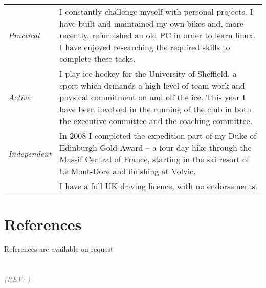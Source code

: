 \documentclass[oneside,a4paper]{article}
\begin{document}
\hspace{-6pt}\begin{tabular}{>{\it}lp{430pt}}
Practical & I constantly challenge myself with personal projects. I have built and maintained my own bikes and, more recently, refurbished an old PC in order to learn linux. I have enjoyed researching the required skills to complete these tasks. \\[4pt]
Active & I play ice hockey for the University of Sheffield, a sport which demands a high level of team work and physical commitment on and off the ice. This year I have been involved in the running of the club in both the executive committee and the coaching committee. \\[4pt]
Independent & In 2008 I completed the expedition part of my Duke of Edinburgh Gold Award -- a four day hike through the Massif Central of France, starting in the ski resort of Le Mont-Dore and finishing at Volvic. \\[4pt]
& I have a full UK driving licence, with no endorsements.
\end{tabular}

\section*{References}

References are available on request
\\\\\\
\small\textcolor{Gray}{\it \VCDateTEX\quad(REV: \VCRevision)}

\end{document}
